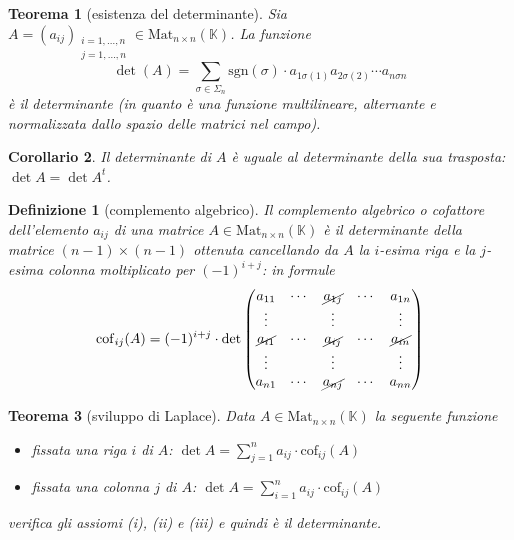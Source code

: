 \documentclass[9pt, a4paper]{article}
\newcommand{\K}{\mathbb{K}}
\newcommand{\sgn}{\mathrm{sgn}}
\newcommand{\cof}{\mathrm{cof}}
\theoremstyle{mythm}
\newtheorem{definition}{Definizione}[section]
\newtheorem{thm}{Teorema}[section]
\newtheorem{corollary}[thm]{Corollario}
\begin{document}
\begin{thm}[esistenza del determinante]
	Sia $ A = (a_{ij})_{\substack{i = 1, \ldots, n \\ j = 1, \ldots, n}} \in \mathrm{Mat}_{n \times n} (\K) $. La funzione \[\det(A) = \sum_{\sigma \in \Sigma_n} \sgn(\sigma) \cdot a_{1 \sigma(1)} a_{2 \sigma(2)} \cdots a_{n \sigma{n}}\] è il determinante (in quanto è una funzione multilineare, alternante e normalizzata dallo spazio delle matrici nel campo). 
\end{thm}

\begin{corollary}
	Il determinante di $ A $ è uguale al determinante della sua trasposta: $ \det A = \det A^{t} $. 
\end{corollary}

\begin{definition}[complemento algebrico]
	Il complemento algebrico o cofattore dell'elemento $ a_{ij} $ di una matrice $ A \in \mathrm{Mat}_{n \times n} (\K) $ è il determinante della matrice $ (n - 1) \times (n - 1) $ ottenuta cancellando da $ A $ la $ i $-esima riga e la $ j $-esima colonna moltiplicato per $ (-1)^{i + j} $: in formule
	\[\cof_{ij}(A) = (-1)^{i + j} \cdot \det 
	\begin{pmatrix}
		a_{11} & \cdots & \cancel{a_{1j}} & \cdots & a_{1n} \\
		\vdots &        & \vdots &        & \vdots \\
		\cancel{a_{i1}} & \cdots & \cancel{a_{ij}} & \cdots & \cancel{a_{in}} \\
		\vdots &  		& \vdots &  	  & \vdots \\
		a_{n1} & \cdots & \cancel{a_{nj}} & \cdots & a_{nn} \\
	\end{pmatrix}\]
\end{definition}

\begin{thm}[sviluppo di Laplace]
	Data $ A \in \mathrm{Mat}_{n \times n} (\K) $ la seguente funzione
	\begin{itemize}
		\item fissata una riga $ i $ di $ A $: $ \det A = \sum_{j = 1}^{n} a_{ij} \cdot \cof_{ij} (A) $
		\item fissata una colonna $ j $ di $ A $: $ \det A = \sum_{i = 1}^{n} a_{ij} \cdot \cof_{ij} (A) $
	\end{itemize}
	verifica gli assiomi (i), (ii) e (iii) e quindi è il determinante. 
\end{thm}
\end{document}
